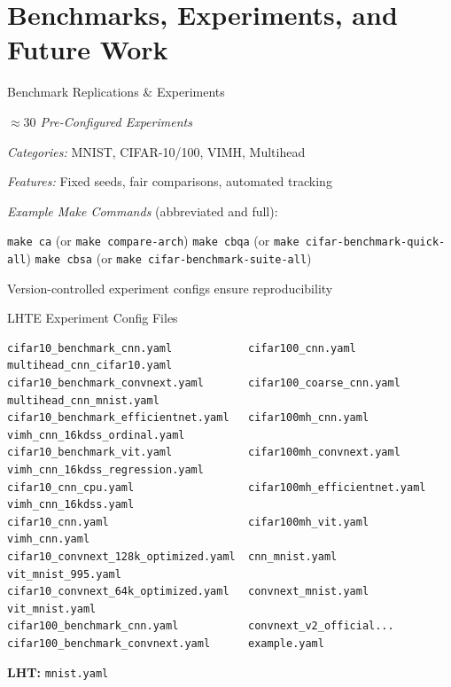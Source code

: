 \section[toc={Workflows}]{Benchmarks, Experiments, and Future Work}

\begin{slide}[\slideopts,toc={Benchmarks}]{Benchmark Replications \& Experiments}
  
  \emph{$\approx 30$ Pre-Configured Experiments}
  
  \begin{itemize}
    \mpitem \emph{Categories:} MNIST, CIFAR-10/100, VIMH, Multihead
    
    \mpitem \emph{Features:} Fixed seeds, fair comparisons, automated tracking
    
    \mpitem \emph{Example Make Commands} (abbreviated and full):
    \begin{itemize}
      \mpitem \texttt{make ca} \quad \quad (or \texttt{make compare-arch})
      \mpitem \texttt{make cbqa} \quad (or \texttt{make cifar-benchmark-quick-all})
      \mpitem \texttt{make cbsa} \quad (or \texttt{make cifar-benchmark-suite-all})
    \end{itemize}
    \mpitem Version-controlled experiment configs ensure reproducibility
  \end{itemize}
\end{slide}

\begin{wideslide}[\slideopts,toc={Experiments},method=direct]{LHTE Experiment Config Files}
{\footnotesize
\begin{verbatim}
cifar10_benchmark_cnn.yaml            cifar100_cnn.yaml             multihead_cnn_cifar10.yaml
cifar10_benchmark_convnext.yaml       cifar100_coarse_cnn.yaml      multihead_cnn_mnist.yaml
cifar10_benchmark_efficientnet.yaml   cifar100mh_cnn.yaml           vimh_cnn_16kdss_ordinal.yaml
cifar10_benchmark_vit.yaml            cifar100mh_convnext.yaml      vimh_cnn_16kdss_regression.yaml
cifar10_cnn_cpu.yaml                  cifar100mh_efficientnet.yaml  vimh_cnn_16kdss.yaml
cifar10_cnn.yaml                      cifar100mh_vit.yaml           vimh_cnn.yaml
cifar10_convnext_128k_optimized.yaml  cnn_mnist.yaml                vit_mnist_995.yaml
cifar10_convnext_64k_optimized.yaml   convnext_mnist.yaml           vit_mnist.yaml
cifar100_benchmark_cnn.yaml           convnext_v2_official...
cifar100_benchmark_convnext.yaml      example.yaml                  
\end{verbatim}
}
\textbf{LHT:} \; \texttt{mnist.yaml}
\end{wideslide}

